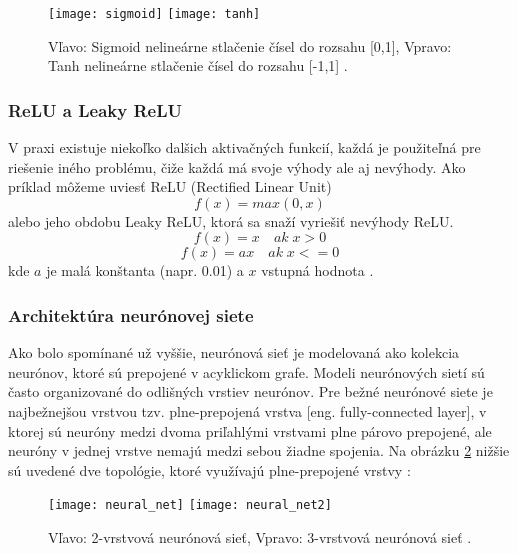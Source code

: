 \begin{figure}[H]
    \centering
    \texttt{[image: sigmoid]}
    \qquad
    \texttt{[image: tanh]}
    \caption{
        Vľavo: Sigmoid nelineárne stlačenie čísel do rozsahu [0,1],
        Vpravo: Tanh nelineárne stlačenie čísel do rozsahu [-1,1] \cite{odkaz:ConvolutionalNeuralNetworkCS231n}.
    }
    \label{pic:ActivationFunctions}
\end{figure}

\subsubsection{ReLU a Leaky ReLU}
V praxi existuje niekoľko dalšich aktivačných funkcií, každá je použiteľná pre riešenie iného problému,
    čiže každá má svoje výhody ale aj nevýhody.
Ako príklad môžeme uviesť ReLU (Rectified Linear Unit)
\begin{equation}
    f(x) = max(0,x)
\end{equation}
alebo jeho obdobu Leaky ReLU, ktorá sa snaží vyriešiť nevýhody ReLU.
\begin{equation}
    f(x) = x \quad ak \; x > 0
\end{equation}
\begin{equation}
    f(x) = ax \quad ak \; x <= 0
\end{equation}
kde $a$ je malá konštanta (napr. 0.01) a $x$ vstupná hodnota \cite{odkaz:ConvolutionalNeuralNetworkCS231n}.

\subsubsection{Architektúra neurónovej siete}
Ako bolo spomínané už vyššie, neurónová sieť je modelovaná ako kolekcia neurónov, ktoré sú prepojené v acyklickom grafe.
Modeli neurónových sietí sú často organizované do odlišných vrstiev neurónov.
Pre bežné neurónové siete je najbežnejšou vrstvou tzv. plne-prepojená vrstva [eng. fully-connected layer],
    v ktorej sú neuróny medzi dvoma priľahlými vrstvami plne párovo prepojené, ale neuróny v jednej vrstve nemajú medzi sebou žiadne spojenia.
Na obrázku \ref{pic:NeuralNetworkArchitecture} nižšie sú uvedené dve topológie, ktoré využívajú plne-prepojené vrstvy \cite{odkaz:ConvolutionalNeuralNetworkCS231n}:
\begin{figure}[H]
    \centering
    \texttt{[image: neural\_net]}
    \qquad
    \texttt{[image: neural\_net2]}
    \caption{Vľavo: 2-vrstvová neurónová sieť, Vpravo: 3-vrstvová neurónová sieť \cite{odkaz:ConvolutionalNeuralNetworkCS231n}.}
    \label{pic:NeuralNetworkArchitecture}
\end{figure}

